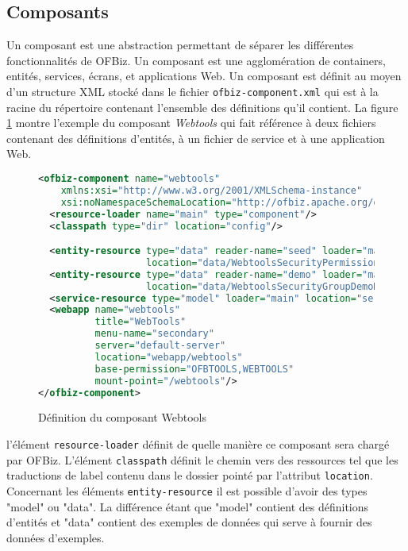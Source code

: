 \documentclass[a4paper, 11pt]{report}
\begin{document}
\subsection{Composants}

Un composant est une abstraction permettant de séparer les différentes
fonctionnalités de OFBiz. Un composant est une agglomération de
containers, entités, services, écrans, et applications Web.  Un
composant est définit au moyen d'un structure XML stocké dans le
fichier \verb=ofbiz-component.xml= qui est à la racine du répertoire
contenant l'ensemble des définitions qu'il contient.  La figure
\ref{fig:ofbizcomponent} montre l'exemple du composant \emph{Webtools}
qui fait référence à deux fichiers contenant des définitions
d'entités, à un fichier de service et à une application Web.

\begin{figure}
  \begin{lstlisting}[language=xml]
<ofbiz-component name="webtools"
    xmlns:xsi="http://www.w3.org/2001/XMLSchema-instance"
    xsi:noNamespaceSchemaLocation="http://ofbiz.apache.org/dtds/ofbiz-component.xsd">
  <resource-loader name="main" type="component"/>
  <classpath type="dir" location="config"/>

  <entity-resource type="data" reader-name="seed" loader="main"
                   location="data/WebtoolsSecurityPermissionSeedData.xml"/>
  <entity-resource type="data" reader-name="demo" loader="main"
                   location="data/WebtoolsSecurityGroupDemoData.xml"/>
  <service-resource type="model" loader="main" location="servicedef/services.xml"/>
  <webapp name="webtools"
          title="WebTools"
          menu-name="secondary"
          server="default-server"
          location="webapp/webtools"
          base-permission="OFBTOOLS,WEBTOOLS"
          mount-point="/webtools"/>
</ofbiz-component>
  \end{lstlisting}
  \caption{Définition du composant Webtools}
  \label{fig:ofbizcomponent}
\end{figure}

l'élément \verb=resource-loader= définit de quelle manière ce
composant sera chargé par OFBiz. L'élément \verb=classpath= définit le
chemin vers des ressources tel que les traductions de label contenu
dans le dossier pointé par l'attribut \verb=location=.  Concernant les
éléments \verb=entity-resource= il est possible d'avoir des types
"model" ou "data". La différence étant que "model" contient des
définitions d'entités et "data" contient des exemples de données qui
serve à fournir des données d'exemples.
\end{document}
